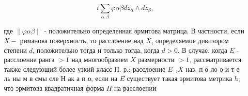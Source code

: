 \documentclass[10pt]{article}
\begin{document}
\[

i \sum_{\alpha, \beta} \varphi \alpha \beta d z_{\alpha} \wedge d \bar{z}_{\beta} \text {, }

\]



где $\|\varphi \alpha \beta\|$ - положительно определенная әрмитова матрица. В частности, если $X-$ риманова поверхность, то расслоение над $X$, определяемое дивизором степени $d$, положительно тогда и только тогда, когда $d>0$. В случае, когда $E$ - расслоение ранга $>1$ над многообразием $X$ размерности $>1$, рассматривается также следующий более узкий класс П. р.: расслоение $E_{\rightarrow} X$ наз. п о ло о и т е ль ны м в смы сле Н ак а п о, если на $E$ существует такая эрмитова метрика $h$, что эрмитова квадратичная форма $H$ на расслоении
\end{document}
